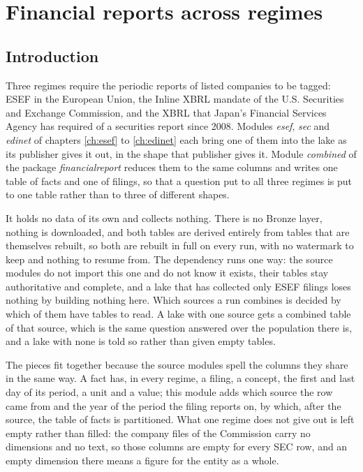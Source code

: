 \chapter{Financial reports across regimes}\label{ch:financialreport}

\section{Introduction}

Three regimes require the periodic reports of listed companies to be tagged: ESEF in the European Union, the Inline XBRL mandate of the U.S. Securities and Exchange Commission, and the XBRL that Japan's Financial Services Agency has required of a securities report since 2008. Modules \emph{esef}, \emph{sec} and \emph{edinet} of chapters \ref{ch:esef} to \ref{ch:edinet} each bring one of them into the lake as its publisher gives it out, in the shape that publisher gives it. Module \emph{combined} of the package \emph{financialreport} reduces them to the same columns and writes one table of facts and one of filings, so that a question put to all three regimes is put to one table rather than to three of different shapes.

It holds no data of its own and collects nothing. There is no Bronze layer, nothing is downloaded, and both tables are derived entirely from tables that are themselves rebuilt, so both are rebuilt in full on every run, with no watermark to keep and nothing to resume from. The dependency runs one way: the source modules do not import this one and do not know it exists, their tables stay authoritative and complete, and a lake that has collected only ESEF filings loses nothing by building nothing here. Which sources a run combines is decided by which of them have tables to read. A lake with one source gets a combined table of that source, which is the same question answered over the population there is, and a lake with none is told so rather than given empty tables.

The pieces fit together because the source modules spell the columns they share in the same way. A fact has, in every regime, a filing, a concept, the first and last day of its period, a unit and a value; this module adds which source the row came from and the year of the period the filing reports on, by which, after the source, the table of facts is partitioned. What one regime does not give out is left empty rather than filled: the company files of the Commission carry no dimensions and no text, so those columns are empty for every SEC row, and an empty dimension there means a figure for the entity as a whole.

